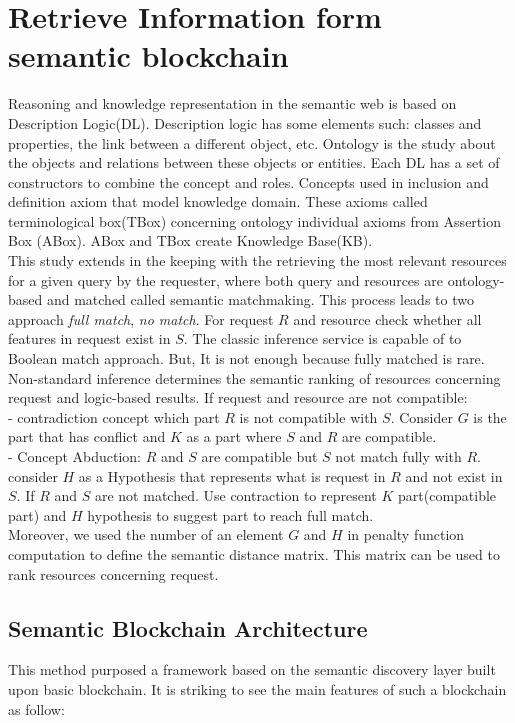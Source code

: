 \section{Retrieve Information form semantic blockchain}
Reasoning and knowledge representation in the semantic web is based on Description Logic(DL). Description logic has some elements such: classes and properties, the link between a different object, etc. Ontology is the study about the objects and relations between these objects or entities.
Each DL has a set of constructors to combine the concept and roles.
Concepts used in inclusion and definition axiom that model knowledge domain. These axioms called terminological box(TBox) concerning ontology individual axioms from Assertion Box (ABox). ABox and TBox create Knowledge Base(KB). \\
This study extends in the keeping with the retrieving the most relevant resources for a given query by the requester, where both query and resources are ontology-based and matched called semantic matchmaking. This process leads to two approach \textit{full match}, \textit{no match}. 
For request $R$ and resource check whether all features in request exist in $S$.
The classic inference service is capable of to Boolean match approach.
But, It is not enough because fully matched is rare. Non-standard inference determines the semantic ranking of resources concerning request and logic-based results.
If request and resource are not compatible:\\
-  contradiction concept which part $R$ is not compatible with $S$. Consider $G$ is the part that has conflict and $K$ as a part where $S$ and $R$ are compatible.\\
- Concept Abduction: $R$ and $S$ are compatible but $S$ not match fully with $R$.
consider $H$ as a Hypothesis that represents what is request in $R$ and not exist in $S$.
If $R$ and $S$ are not matched. Use contraction to represent $K$ part(compatible part) and $H$ hypothesis to suggest part to reach full match.\\
Moreover, we used the number of an element $G$ and $H$ in penalty function computation to define the semantic distance matrix.
This matrix can be used to rank resources concerning request\cite{Ruta}. 

\subsection{Semantic Blockchain Architecture} 
This method purposed a framework based on the semantic discovery layer built upon basic blockchain. It is striking to see the main features of such a blockchain as follow:

